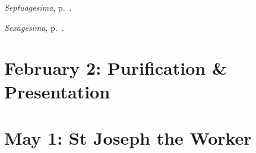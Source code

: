 {{{\emph{Septuagesima}, p.~\pageref{septuagesima}.

\emph{Sexagesima}, p.~\pageref{sexagesima}.
}

\bigskip{}
\benedicamusdomino{}
}


{
\section{February 2: Purification \& Presentation}
\subtitle{ Class, White}
\subtitle{I \& II Vespers}

\def\definevesperspropers{}
\def\definevesperspropersalt{}
\def\vesperspropersnote{At II Vespers:}
\def\vesperspropersaltnote{At I Vespers:}
\def\prechapter{\label{purification-chapter}}
\def\printhymnnote{
  {
    \oldneedspace{3\baselineskip}
    \printnote{Hymn.~\emph{Ave Maris Stella}, p.~\pageref{hymn-avemarisstella}.\\}
  }
}
\bigskip{}
\benedicamusdomino[2]{}
}



{
\section{May 1: St Joseph the Worker}
\subtitle{ Class, White or Gold}
\subtitle{I \& II Vespers}

\def\definevesperspropers{
  \let\oldthing=\maganttranslation
  \def\maganttranslation{\oldthing\needspace{10\baselineskip}}
}
\def\definevesperspropersalt{
  \def\vrlinebreak{T}
  \let\oldthing=\maganttranslation
  \def\maganttranslation{\oldthing\needspace{10\baselineskip}}
}
\def\vesperspropersnote{At II Vespers:}
\def\vesperspropersaltnote{At I Vespers:}
\def\prepsalmthreeverses{\vspace{-0.1\baselineskip}}
\def\prerepeatontiphonthree{}

}}
